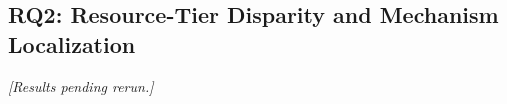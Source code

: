 \documentclass[11pt]{article}
\begin{document}

\subsection{RQ2: Resource-Tier Disparity and Mechanism Localization}
\emph{[Results pending rerun.]}

\end{document}
